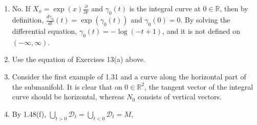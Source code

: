 \begin{enumerate}
(b) Using the same notation as above,
\begin{align*}
{[fX, gY] } & =\sum_{i} \sum_{j}\left(f a_{i} \frac{\partial g b_{j}}{\partial x_{i}}-g b_{i} \frac{\partial f a_{j}}{\partial x_{i}}\right) \frac{\partial}{\partial x_{j}} \\
& =\sum_{i} \sum_{j}\left(f g a_{i} \frac{\partial b_{j}}{\partial x_{i}}-f g b_{i} \frac{\partial a_{j}}{\partial x_{i}}+f a_{i} b_{j} \frac{\partial g}{\partial x_{i}}-g a_{j} b_{i} \frac{\partial f}{\partial x_{i}}\right) \frac{\partial}{\partial x_{j}} \\
& =f g[X, Y]+f(Xg) Y-g(Y\!f) X.
\end{align*}
(c) \[[X, Y]=\sum_{i} \sum_{j}\left(a_{i} \frac{\partial b_{j}}{\partial x_{i}}-b_{i} \frac{\partial a_{j}}{\partial x_{i}}\right) \frac{\partial}{\partial x_{j}}
=-\sum_{i} \sum_{j}\left(b_{i} \frac{\partial a_{j}}{\partial x_{i}}-a_{i} \frac{\partial b_{j}}{\partial x_{i}}\right) \frac{\partial}{\partial x_{j}}=-[Y, X].\]
(d) Let $Z=\sum c_{i} \frac{\partial}{\partial x_{i}}$. Then,
\begin{align*}
{[[X, Y], Z]=} & \sum_{i} \sum_{j} \sum_{k}\left(\left(a_{i} \frac{\partial b_{j}}{\partial x_{i}}-b_{i} \frac{\partial a_{j}}{\partial x_{i}}\right) \frac{\partial c_{k}}{\partial x_{j}}\right. \\
& -c_{j}\left.\left(\frac{\partial a_{i}}{\partial x_{j}} \frac{\partial b_{k}}{\partial x_{i}}+a_{i} \frac{\partial^{2} b_{k}}{\partial x_{j} \partial x_{i}}-\frac{\partial b_{i}}{\partial x_{j}} \frac{\partial a_{k}}{\partial x_{i}}-b_{i} \frac{\partial^{2} a_{k}}{\partial x_{j} \partial x_{i}}\right)\right) \frac{\partial}{\partial x_{k}}
\end{align*}
and by direct calculation, the Jacobi identity gets proved.
\item No. If $X_{x}=\exp (x) \frac{\partial}{\partial r}$ and $\gamma_{0}(t)$ is the integral curve at $0 \in \mathbb{R}$, 
then by definition, $\frac{d\gamma_{0}}{dt}(t)=\exp (\gamma_{0}(t))$ and $\gamma_{0}(0)=0$. 
By solving the differential equation, $\gamma_{0}(t)=-\log (-t+1)$, and it is not defined on $(-\infty, \infty)$.
\item Use the equation of Exercises 13(a) above.
\item Consider the first example of 1.31 and a curve along the horizontal part of the submanifold. 
It is clear that on $0 \in \mathbb{R}^{2}$, the tangent vector of the integral curve should be horizontal, whereas $N_{0}$ consists of vertical vectors.
\item By 1.48(f), $\bigcup_{t>0} \mathcal{D}_{t}=\bigcup_{t<0} \mathcal{D}_{t}=M$, 

\end{enumerate}
